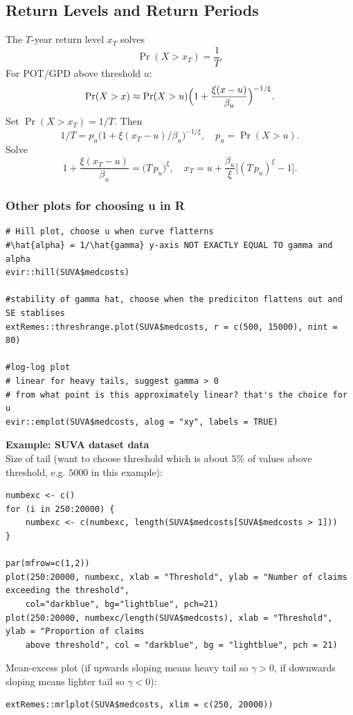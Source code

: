 \documentclass{article}
\begin{document}
\subsection{Return Levels and Return Periods}
\noindent The \(T\)-year return level \(x_T\) solves
\[
\Pr(X > x_T) = \frac{1}{T}.
\]
For POT/GPD above threshold \(u\):
\[
\Pr(X > x) 
\approx \Pr(X > u) \Bigl(1 + \frac{\xi (x - u)}{\beta_u}\Bigr)^{-1/\xi}.
\]
Set \(\Pr(X > x_T) = 1/T\). Then
\[
1/T = p_u \bigl(1 + \xi (x_T - u) / \beta_u\bigr)^{-1/\xi},
\quad p_u = \Pr(X > u).
\]
Solve
\[
1 + \frac{\xi (x_T - u)}{\beta_u} = \bigl(T\,p_u\bigr)^\xi,
\quad 
x_T = u + \frac{\beta_u}{\xi}\bigl[(T\,p_u)^\xi - 1\bigr].
\]


\subsubsection{Other plots for choosing u in R}

\begin{lstlisting}
# Hill plot, choose u when curve flatterns
#\hat{alpha} = 1/\hat{gamma} y-axis NOT EXACTLY EQUAL TO gamma and alpha
evir::hill(SUVA$medcosts)

#stability of gamma hat, choose when the prediciton flattens out and SE stablises
extRemes::threshrange.plot(SUVA$medcosts, r = c(500, 15000), nint = 80)

#log-log plot
# linear for heavy tails, suggest gamma > 0
# from what point is this approximately linear? that's the choice for u
evir::emplot(SUVA$medcosts, alog = "xy", labels = TRUE)
\end{lstlisting}

\noindent \textbf{Example: SUVA dataset data} \\
\noindent Size of tail (want to choose threshold which is about $5\%$ of values above threshold, e.g. $5000$ in this example):
\begin{lstlisting}
numbexc <- c()
for (i in 250:20000) {
    numbexc <- c(numbexc, length(SUVA$medcosts[SUVA$medcosts > 1]))
}

par(mfrow=c(1,2))
plot(250:20000, numbexc, xlab = "Threshold", ylab = "Number of claims exceeding the threshold",
    col="darkblue", bg="lightblue", pch=21)
plot(250:20000, numbexc/length(SUVA$medcosts), xlab = "Threshold", ylab = "Proportion of claims
    above threshold", col = "darkblue", bg = "lightblue", pch = 21)
\end{lstlisting}


\noindent Mean-excess plot (if upwards sloping means heavy tail so $\gamma > 0$, if downwards sloping means lighter tail so $\gamma < 0$):
\begin{lstlisting}
extRemes::mrlplot(SUVA$medcosts, xlim = c(250, 20000))
\end{lstlisting}
\end{document}
